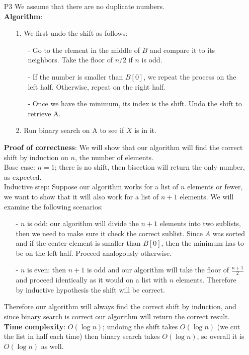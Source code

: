 \documentclass{article}
\begin{document}
\newpage
\begin{itemize}
    \item [P3] We assume that there are no duplicate numbers.\\
          \textbf{Algorithm}:
          \begin{itemize}
              \item [1.] We first undo the shift as follows:
                    \begin{itemize}
                        \item [-] Go to the element in the middle of $B$ and compare it to its neighbors. Take the floor of $n/2$ if $n$ is odd.
                        \item [-] If the number is smaller than $B[0]$, we repeat the process on the left half. Otherwise, repeat on the right half.
                        \item [-] Once we have the minimum, its index is the shift. Undo the shift to retrieve A.
                    \end{itemize}
              \item [2.] Run binary search on A to see if $X$ is in it.
          \end{itemize}
          \textbf{Proof of correctness}: We will show that our algorithm will find the correct shift by induction on $n$, the number of elements.\\
          Base case: $n=1$; there is no shift, then bisection will return the only number, as expected.\\
          Inductive step: Suppose our algorithm works for a list of $n$ elements or fewer, we want to show that it will also work for a list of $n+1$ elements. We will examine the following scenarios:
          \begin{itemize}
              \item [-] $n$ is odd: our algorithm will divide the $n+1$ elements into two sublists, then we need to make sure it check the correct sublist. Since $A$ was sorted and if the center element is smaller than $B[0]$, then the minimum has to be on the left half. Proceed analogously otherwise.
              \item [-] $n$ is even: then $n+1$ is odd and our algorithm will take the floor of $\frac{n+1}{2}$ and proceed identically as it would on a list with $n$ elements. Therefore by inductive hypothesis the shift will be correct.
          \end{itemize}
          Therefore our algorithm will always find the correct shift by induction, and since binary search is correct our algorithm will return the correct result.\\
          \textbf{Time complexity}: $O(\log n)$; undoing the shift takes $O(\log n)$ (we cut the list in half each time) then binary search takes $O(\log n)$, so overall it is $O(\log n)$ as well.
\end{itemize}
\end{document}
